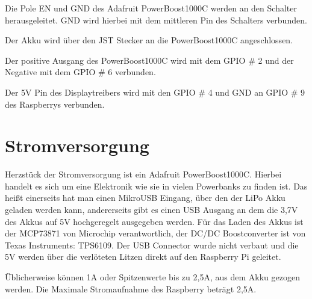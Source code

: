 Die Pole EN und GND des Adafruit PowerBoost1000C werden an den Schalter herausgeleitet. GND wird hierbei mit dem mittleren Pin des Schalters verbunden. 

Der Akku wird über den JST Stecker an die PowerBoost1000C angeschlossen. 

Der positive Ausgang des PowerBoost1000C wird mit dem GPIO \# 2 und der Negative mit dem GPIO \# 6 verbunden. 

Der 5V Pin des Displaytreibers wird mit den GPIO \# 4 und GND an GPIO \# 9 des Raspberrys verbunden. 

\section{Stromversorgung}

Herzstück der Stromversorgung ist ein Adafruit PowerBoost1000C. Hierbei handelt es sich um eine Elektronik wie sie in vielen Powerbanks zu finden ist. Das heißt einerseits hat man einen MikroUSB Eingang, über den der LiPo Akku geladen werden kann, andererseits gibt es einen USB Ausgang an dem die 3,7V des Akkus auf 5V hochgeregelt ausgegeben werden. Für das Laden des Akkus ist der MCP73871 von Microchip verantwortlich, der DC/DC Boostconverter ist von Texas Instruments: TPS6109. Der USB Connector wurde nicht verbaut und die 5V werden über die verlöteten Litzen direkt auf den Raspberry Pi geleitet. 

Üblicherweise können 1A oder Spitzenwerte bis zu 2,5A, aus dem Akku gezogen werden. Die Maximale Stromaufnahme des Raspberry beträgt 2,5A.  
